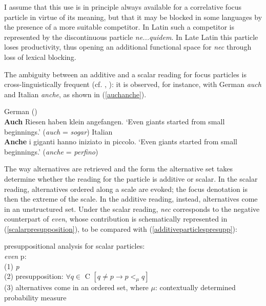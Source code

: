 \documentclass[output=paper,modfonts,nonflat,citecolor=brown,
showindex
]{langsci/langscibook}
\begin{document}
I assume that this use is in principle always available for a correlative focus particle in virtue of its meaning, but that it may be blocked in some languages by the presence of a more suitable competitor. In Latin such a competitor is represented by the discontinuous particle {\emph{ne...quidem}}. In Late Latin this particle loses productivity, thus opening an additional functional space for {\emph{nec}} through loss of lexical blocking.

The ambiguity between an additive and a scalar reading for focus particles is cross-linguistically frequent (cf. \citealt[158--159]{Koenig91}, \citealt[24--25]{GastAuwera11}): it is observed, for instance, with German {\emph{auch}} and Italian {\emph{anche}}, as shown in (\ref{auchanche}).

{\begin{exe}
\ex \label{auchanche}
\begin{xlist}
\ex German (\citealt[62]{Koenig91})\\{\textbf{Auch}} Riesen haben klein angefangen.
\glt `Even giants started from small beginnings.' ({\emph{auch}} = {\emph{sogar}})
\ex Italian\\{\textbf{Anche}} i giganti hanno iniziato in piccolo.
\glt `Even giants started from small beginnings.' ({\emph{anche}} = {\emph{perfino}})
\end{xlist}
\end{exe}}

\noindent The way alternatives are retrieved and the form the alternative set takes determine whether the reading for the particle is additive or scalar. In the scalar reading, alternatives ordered along a scale are evoked; the focus denotation is then the extreme of the scale. In the additive reading, instead, alternatives come in an unstructured set. Under the scalar reading, {\emph{nec}} corresponds to the negative counterpart of {\emph{even}}, whose contribution is schematically represented in (\ref{scalarpresupposition}), to be compared with (\ref{additiveparticlespresupp}): %

{\begin{exe}
\ex \label{scalarpresupposition} presuppositional analysis for scalar particles:\\
{\emph{even}} p:\\
(1) {\emph{p}}\\
(2) presupposition: $\forall q \in$ C $[q \neq p \rightarrow p <_{\mu} q]$\\
(3) alternatives come in an ordered set, where ${\mu}$: contextually determined probability measure %
\end{exe}}
\end{document}
